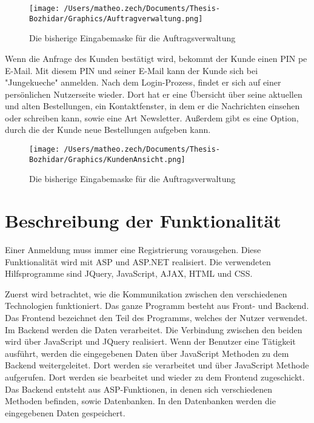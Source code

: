 \begin{figure}[h]
	\centering
	\texttt{[image: /Users/matheo.zech/Documents/Thesis-Bozhidar/Graphics/Auftragverwaltung.png]}
	\caption[Auftragsverwaltung]{Die bisherige Eingabemaske für die Auftragsverwaltung}
	\label{fig:Auftragverwaltung}
\end{figure}

Wenn die Anfrage des Kunden bestätigt wird, bekommt der Kunde einen PIN pe E-Mail. Mit diesem PIN und seiner E-Mail kann der Kunde sich bei "Jungekueche" anmelden. Nach dem Login-Prozess, findet er sich auf einer persönlichen Nutzerseite wieder. Dort hat er eine Übersicht über seine aktuellen und alten Bestellungen, ein Kontaktfenster, in dem er die Nachrichten einsehen oder schreiben kann, sowie eine Art Newsletter. Außerdem gibt es eine Option, durch die der Kunde neue Bestellungen aufgeben kann.  

\begin{figure}[h]
	\centering
	\texttt{[image: /Users/matheo.zech/Documents/Thesis-Bozhidar/Graphics/KundenAnsicht.png]}
	\caption[Kundeansicht]{Die bisherige Eingabemaske für die Auftragsverwaltung}
	\label{fig:KundenAnsicht}
\end{figure}

\section{Beschreibung der Funktionalität}   

Einer Anmeldung muss immer eine Registrierung vorausgehen. Diese Funktionalität wird mit ASP und ASP.NET realisiert. Die verwendeten Hilfsprogramme sind JQuery, JavaScript, AJAX, HTML und CSS. 

Zuerst wird betrachtet, wie die Kommunikation zwischen den verschiedenen Technologien funktioniert. Das ganze Programm besteht aus Front- und Backend. Das Frontend bezeichnet den Teil des Programms, welches der Nutzer verwendet. Im Backend werden die Daten verarbeitet. Die Verbindung zwischen den beiden wird über JavaScript und JQuery realisiert. Wenn der Benutzer eine Tätigkeit ausführt, werden die eingegebenen Daten über JavaScript Methoden zu dem Backend weitergeleitet. Dort werden sie verarbeitet und über JavaScript Methode aufgerufen. Dort werden sie bearbeitet und wieder zu dem Frontend zugeschickt. Das Backend entsteht aus ASP-Funktionen, in denen sich verschiedenen Methoden befinden, sowie Datenbanken. In den Datenbanken werden die eingegebenen Daten gespeichert.

